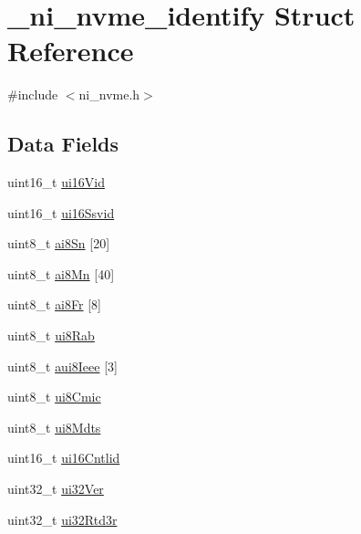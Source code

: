 \hypertarget{struct__ni__nvme__identify}{}\section{\+\_\+ni\+\_\+nvme\+\_\+identify Struct Reference}
\label{struct__ni__nvme__identify}


{\ttfamily \#include $<$ni\+\_\+nvme.\+h$>$}

\subsection*{Data Fields}
\begin{DoxyCompactItemize}
\item 
uint16\+\_\+t \mbox{\hyperlink{struct__ni__nvme__identify_ad7f325004e0b855d3c08f0418bd484eb}{ui16\+Vid}}
\item 
uint16\+\_\+t \mbox{\hyperlink{struct__ni__nvme__identify_a8fa8d14be154506fd52ae3479b592557}{ui16\+Ssvid}}
\item 
uint8\+\_\+t \mbox{\hyperlink{struct__ni__nvme__identify_aba1fb10fa3fa0319a5668b1eb13561c0}{ai8\+Sn}} \mbox{[}20\mbox{]}
\item 
uint8\+\_\+t \mbox{\hyperlink{struct__ni__nvme__identify_afd3a2dfe95be0aabd1608bb7c62149ef}{ai8\+Mn}} \mbox{[}40\mbox{]}
\item 
uint8\+\_\+t \mbox{\hyperlink{struct__ni__nvme__identify_a05e4d990aa51cdd4e78b909dd8e3dc81}{ai8\+Fr}} \mbox{[}8\mbox{]}
\item 
uint8\+\_\+t \mbox{\hyperlink{struct__ni__nvme__identify_a1726eddd302563d650b5dd3e27698df2}{ui8\+Rab}}
\item 
uint8\+\_\+t \mbox{\hyperlink{struct__ni__nvme__identify_a49468c7cf8f9fac056df3e85f1c3e6d1}{aui8\+Ieee}} \mbox{[}3\mbox{]}
\item 
uint8\+\_\+t \mbox{\hyperlink{struct__ni__nvme__identify_a38ce995ca6d829dbe69408fd4a3899d1}{ui8\+Cmic}}
\item 
uint8\+\_\+t \mbox{\hyperlink{struct__ni__nvme__identify_a6e521d6d9cc4ed3bb87101a6d45eb821}{ui8\+Mdts}}
\item 
uint16\+\_\+t \mbox{\hyperlink{struct__ni__nvme__identify_a1678f7d858c6effd1b7920c7d9be2009}{ui16\+Cntlid}}
\item 
uint32\+\_\+t \mbox{\hyperlink{struct__ni__nvme__identify_a72a5806857cb007c8e3f48e41af484ba}{ui32\+Ver}}
\item 
uint32\+\_\+t \mbox{\hyperlink{struct__ni__nvme__identify_a1a548e42c50291eeae231ae68f8650ea}{ui32\+Rtd3r}}

\end{DoxyCompactItemize}
